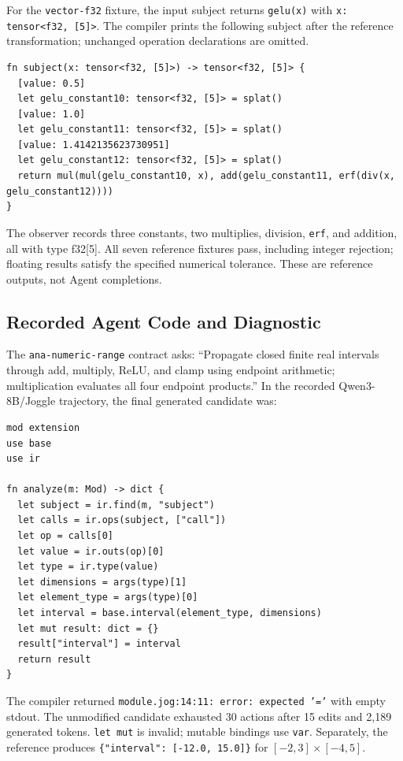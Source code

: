 

For the \texttt{vector-f32} fixture, the input subject returns \texttt{gelu(x)}
with \texttt{x: tensor<f32, [5]>}. The compiler prints the following subject
after the reference transformation; unchanged operation declarations are omitted.

\begin{lstlisting}
fn subject(x: tensor<f32, [5]>) -> tensor<f32, [5]> {
  [value: 0.5]
  let gelu_constant10: tensor<f32, [5]> = splat()
  [value: 1.0]
  let gelu_constant11: tensor<f32, [5]> = splat()
  [value: 1.4142135623730951]
  let gelu_constant12: tensor<f32, [5]> = splat()
  return mul(mul(gelu_constant10, x), add(gelu_constant11, erf(div(x, gelu_constant12))))
}
\end{lstlisting}

The observer records three constants, two multiplies, division, \texttt{erf}, and
addition, all with type f32[5]. All seven reference fixtures pass, including
integer rejection; floating results satisfy the specified numerical tolerance.
These are reference outputs, not Agent completions.

\subsection{Recorded Agent Code and Diagnostic}
\label{sec:agent-code}

The \texttt{ana-numeric-range} contract asks: ``Propagate closed finite real
intervals through add, multiply, ReLU, and clamp using endpoint arithmetic;
multiplication evaluates all four endpoint products.'' In the recorded
Qwen3-8B/Joggle trajectory, the final generated candidate was:

\begin{lstlisting}
mod extension
use base
use ir

fn analyze(m: Mod) -> dict {
  let subject = ir.find(m, "subject")
  let calls = ir.ops(subject, ["call"])
  let op = calls[0]
  let value = ir.outs(op)[0]
  let type = ir.type(value)
  let dimensions = args(type)[1]
  let element_type = args(type)[0]
  let interval = base.interval(element_type, dimensions)
  let mut result: dict = {}
  result["interval"] = interval
  return result
}
\end{lstlisting}

The compiler returned \texttt{module.jog:14:11: error: expected '='} with empty stdout.
The unmodified candidate exhausted 30 actions after 15 edits and 2,189 generated
tokens. \texttt{let mut} is invalid; mutable bindings use \texttt{var}. Separately,
the reference produces \texttt{\{"interval": [-12.0, 15.0]\}}
for $[-2,3]\times[-4,5]$.

